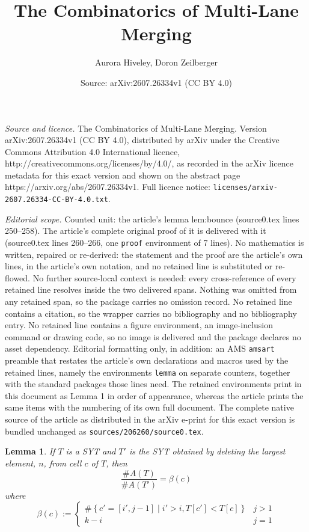 \documentclass[10pt,a4paper]{amsart}
\title{The Combinatorics of Multi-Lane Merging}
\author{Aurora Hiveley, Doron Zeilberger}
\date{Source: arXiv:2607.26334v1 (CC BY 4.0)}
\newtheorem{lemma}{Lemma}
\begin{document}
\maketitle

\noindent\emph{Source and licence.} The Combinatorics of Multi-Lane Merging. Version arXiv:2607.26334v1 (CC BY 4.0), distributed by arXiv under the Creative Commons Attribution 4.0 International licence, http://creativecommons.org/licenses/by/4.0/, as recorded in the arXiv licence metadata for this exact version and shown on the abstract page https://arxiv.org/abs/2607.26334v1. Full licence notice: \texttt{licenses/arxiv-2607.26334-CC-BY-4.0.txt}.\par\smallskip

\noindent\textit{Editorial scope.} Counted unit: the article's lemma lem:bounce (source0.tex lines 250--258). The article's complete original proof of it is delivered with it (source0.tex lines 260--266, one \texttt{proof} environment of 7 lines). No mathematics is written, repaired or re-derived: the statement and the proof are the article's own lines, in the article's own notation, and no retained line is substituted or re-flowed.  No further source-local context is needed: every cross-reference of every retained line resolves inside the two delivered spans.  Nothing was omitted from any retained span, so the package carries no omission record.  No retained line contains a citation, so the wrapper carries no bibliography and no bibliography entry.  No retained line contains a figure environment, an image-inclusion command or drawing code, so no image is delivered and the package declares no asset dependency.  Editorial formatting only, in addition: an AMS \texttt{amsart} preamble that restates the article's own declarations and macros used by the retained lines, namely the environments \texttt{lemma} on separate counters, together with the standard packages those lines need.  The retained environments print in this document as Lemma 1 in order of appearance, whereas the article prints the same items with the numbering of its own full document.  The complete native source of the article as distributed in the arXiv e-print for this exact version is bundled unchanged as \texttt{sources/206260/source0.tex}.
\begin{lemma} \label{lem:bounce}
    If $T$ is a SYT and $T'$ is the SYT obtained by deleting the largest element, $n$, from cell $c$ of $T$, then
\[ \frac{\#A(T)}{\#A(T')} = \beta(c)\]
where
    $$\beta(c) := \begin{cases}
    \# \left\{ c' = [i', j-1] \mid i' > i, T[c'] < T[c]  \right\} & j > 1 \\
    k - i & j = 1
    \end{cases}$$
\end{lemma}
\end{document}
